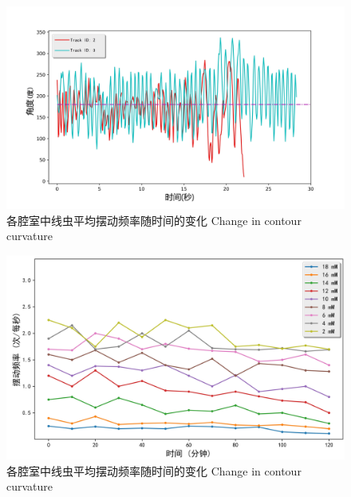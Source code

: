 	 \begin{figure}[h]
	  \centering
	  \includegraphics[width=14cm]{figure/chap5/angle.jpg}
	  \bicaption
		{各腔室中线虫平均摆动频率随时间的变化}
		{Change in contour curvature}
	  \label{fig:angle}
	\end{figure}
	\begin{figure}[!h]
	  \centering
	  \includegraphics[width=13cm]{figure/chap5/res.jpg}
	  \bicaption
		{各腔室中线虫平均摆动频率随时间的变化}
		{Change in contour curvature}
	  \label{fig:res}
	\end{figure}
	
